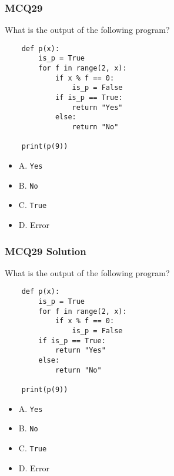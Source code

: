 \documentclass{beamer}
\begin{document}
\begin{frame}[fragile]
    \frametitle{MCQ29}
    What is the output of the following program?
    \begin{verbatim}
    def p(x):
        is_p = True
        for f in range(2, x):
            if x % f == 0:
                is_p = False
            if is_p == True:
                return "Yes"
            else:
                return "No"

    print(p(9))
    \end{verbatim}
    \begin{itemize}
        \item A. \texttt{Yes}
        \item B. \texttt{No}
        \item C. \texttt{True}
        \item D. Error
    \end{itemize}
\end{frame}
\begin{frame}[fragile]
    \frametitle{MCQ29 Solution}
    What is the output of the following program?
    \begin{verbatim}
    def p(x):
        is_p = True
        for f in range(2, x):
            if x % f == 0:
                is_p = False
        if is_p == True:
            return "Yes"
        else:
            return "No"

    print(p(9))
    \end{verbatim}
    \begin{itemize}
        \item \alert{A. \texttt{Yes}}
        \item B. \texttt{No}
        \item C. \texttt{True}
        \item D. Error
    \end{itemize}
\end{frame}
\end{document}
